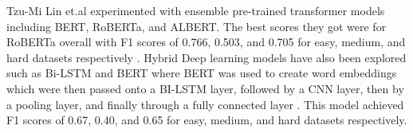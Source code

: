 Tzu-Mi Lin et.al experimented with ensemble pre-trained transformer models including BERT, RoBERTa, and ALBERT. The best scores they got were for RoBERTa overall with F1 scores of 0.766, 0.503, and 0.705 for easy, medium, and hard datasets respectively \cite{paper_2022}. Hybrid Deep learning models have also been explored such as Bi-LSTM and BERT where BERT was used to create word embeddings which were then passed onto a BI-LSTM layer, followed by a CNN layer, then by a pooling layer, and finally through a fully connected layer \cite{paper_2022_2}. This model achieved F1 scores of 0.67, 0.40, and 0.65 for easy, medium, and hard datasets respectively.




